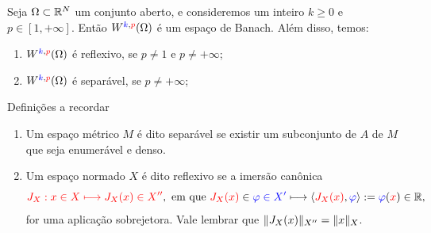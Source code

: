 \begin{frame}
	\begin{prop}
	Seja \(\Omega \subset \mathbb{R}^N\) um conjunto aberto, e consideremos um inteiro {\color{blue}\(k \geq 0\)} e {\color{red}$p\in [1,+\infty]$}. Então $W^{{\color{blue}k},{\color{red}p}}(\Omega)$ é um {\color{blue}espaço de Banach}. Além disso, temos:
	
	\begin{enumerate}[a]
	\item $W^{{\color{blue}k},{\color{red}p}}(\Omega)$ é {\color{red}reflexivo}, se {\color{red}\(p\neq 1\)} e {\color{red}\(p\neq +\infty\)};
	\item $W^{{\color{blue}k},{\color{red}p}}(\Omega)$ é {\color{red}separável}, se  {\color{red}\(p\neq +\infty\)};	
	\end{enumerate}
\end{prop}

\begin{block}{Definições a recordar}
\begin{enumerate}
\item Um espaço métrico \(M\) é dito {\color{red}separável} se existir um subconjunto de \(A\) de \(M\) que seja {\color{red}enumerável} e {\color{red}denso}.

\item Um espaço normado \(X\) é dito {\color{red}reflexivo} se a imersão canônica
\[
{\color{red}J_X:x\in X\longmapsto J_X(x)\in X''}, \text{ em que } {\color{red}J_X(x)}\in {\color{blue}\varphi\in X'}\longmapsto \langle{\color{red} J_X(x)},{\color{blue}\varphi}\rangle := {\color{blue}\varphi}({\color{red}x})\in \mathbb{R},
\]
for uma aplicação {\color{red}sobrejetora}. Vale lembrar que {\color{red}\(\lVert J_X(x)\rVert_{X''}=\lVert x\rVert_X\)}.
\end{enumerate}
\end{block}
\end{frame}



